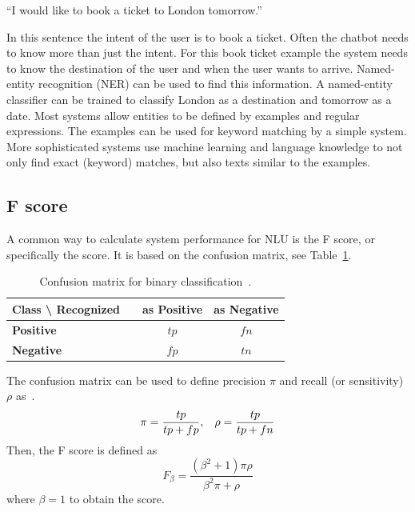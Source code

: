 \begin{center}
    ``I would like to book a ticket to London tomorrow.''
\end{center}

In this sentence the intent of the user is to book a ticket.
Often the chatbot needs to know more than just the intent.
For this book ticket example the system needs to know the destination of the user and when the user wants to arrive.
Named-entity recognition (NER) can be used to find this information.
A named-entity classifier can be trained to classify London as a destination and tomorrow as a date.
Most systems allow entities to be defined by examples and regular expressions.
The examples can be used for keyword matching by a simple system.
More sophisticated systems use machine learning and language knowledge to not only find exact (keyword) matches, but also texts similar to the examples.

\subsection{F score}
\label{subsec:f1_score}
A common way to calculate system performance for NLU is the F score, or specifically the \fone score.
It is based on the confusion matrix, see Table~\ref{tab:confusion}.

\begin{table}[htbp]
    \centering
    \begin{tabular}{l l c c}
        \textbf{Class \textbackslash \: Recognized} & \vline & \textbf{as Positive} & \textbf{as Negative}\\
        \hline
        \textbf{Positive} & \vline & $tp$ & $fn$\\
        \textbf{Negative} & \vline & $fp$ & $tn$\\
    \end{tabular}
    \caption{Confusion matrix for binary classification~\cite[Table 1]{sokolova2006beyond}.}
    \label{tab:confusion}
\end{table}

\noindent The confusion matrix can be used to define precision $\pi$ and recall (or sensitivity) $\rho$ as~\citep{sokolova2006beyond}.
\[
    \pi = \frac{tp}{tp + fp}, \hspace*{3mm} \rho = \frac{tp}{tp + fn}
\]
Then, the F score is defined as~\citep{debole2004supervised}
\[
    F_\beta = \frac{(\beta^2 + 1) \pi \rho}{\beta^2 \pi + \rho}
\]
where $\beta = 1$ to obtain the \fone score.

